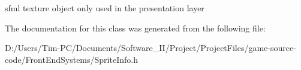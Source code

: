sfml texture object only used in the presentation layer 

The documentation for this class was generated from the following file\+:\begin{DoxyCompactItemize}
\item 
D\+:/\+Users/\+Tim-\/\+P\+C/\+Documents/\+Software\+\_\+\+I\+I/\+Project/\+Project\+Files/game-\/source-\/code/\+Front\+End\+Systems/Sprite\+Info.\+h\end{DoxyCompactItemize}
